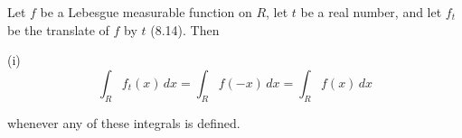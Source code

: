 Let $f$ be a Lebesgue measurable function on $R$, let $t$ be a real number, and let $f_t$ be the translate of $f$ by $t$ (8.14). Then

(i) $$\int_R f_t(x) \, dx = \int_R f(-x) \, dx = \int_R f(x) \, dx$$

whenever any of these integrals is defined.